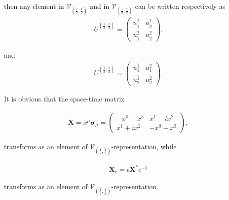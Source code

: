 \documentclass[12pt]{beamer}
\begin{document}
\begin{frame}
then any element in $ \mathcal{V}_{(\frac{1}{2},\dot{\frac{1}{2}})} $ and in $ \mathcal{V}_{(\dot{\frac{1}{2}},\frac{1}{2})} $ can be written respectively as\\[-15pt]

\begin{align}
U^{(\frac{1}{2},\dot{\frac{1}{2}})} =\begin{pmatrix}u^1_{\dot{1}}&u^1_{\dot{2}}\\u^2_{\dot{1}}&u^2_{\dot{2}}\end{pmatrix}.
\end{align}

\noindent and\\[-15pt]

\begin{align}
U^{(\dot{\frac{1}{2}},\frac{1}{2})} =\begin{pmatrix}u^{\dot{1}}_1&u^{\dot{2}}_1\\u^{\dot{1}}_2&u^{\dot{2}}_2\end{pmatrix}.
\end{align}

It is obvious that the space-time matrix

\begin{align}
\bm{X}=x^\mu\bm{\sigma}_\mu=\begin{pmatrix}-x^0+x^3&x^1-ix^2\\x^1+ix^2&-x^0-x^3\end{pmatrix},
\end{align}

\noindent transforms as an element of $ \mathcal{V}_{(\frac{1}{2},\dot{\frac{1}{2}})} $-representation, while

\begin{align}
\bm{X}_c=\epsilon\bm{X}^*\epsilon^{-1}
\end{align}

\noindent transforms as an element of $ \mathcal{V}_{(\dot{\frac{1}{2}},\frac{1}{2})} $-representation.

\end{frame}
\end{document}
